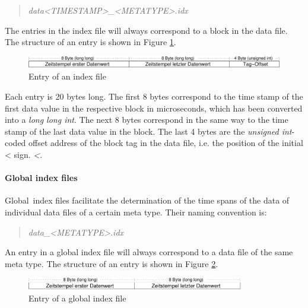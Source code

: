 \documentclass[a4paper,12pt,BCOR6mm,bibtotoc,idxtotoc]{scrbook}
\begin{document}
\begin{quote} \textit{data\textless TIMESTAMP\textgreater\_\textless METATYPE\textgreater.idx} \end{quote}

The entries in the index file will always correspond to a block in the data file. The structure of an entry is shown in Figure \ref{fig:dls_data_index}.

\begin{figure}[htb] \begin{center} \includegraphics[height=15pt]{bilder/dls_data_index} \end{center} \caption{Entry of an index file} \label{fig:dls_data_index} \end{figure}

Each entry is 20 bytes long. The first 8 bytes correspond to the time stamp of the first data value in the respective block in microseconds, which has been converted into a \textit{long long int}. The next 8 bytes correspond in the same way to the time stamp of the last data value in the block. The last 4 bytes are the \textit{unsigned int}-coded offset address of the block tag in the data file, i.e. the position of the initial < sign. \textit{\textless}.

\paragraph{Global index files} \glqq Global\grqq\ index files facilitate the determination of the time spans of the data of individual data files of a certain meta type. Their naming convention is:

\begin{quote} \textit{data\_\textless METATYPE\textgreater.idx} \end{quote}

An entry in a global index file will always correspond to a data file of the same meta type. The structure of an entry is shown in Figure \ref{fig:dls_data_index_glob}.

\begin{figure}[htb] \begin{center} \includegraphics[height=15pt]{bilder/dls_data_index_glob} \end{center} \caption{Entry of a global index file} \label{fig:dls_data_index_glob} \end{figure}
\end{document}
